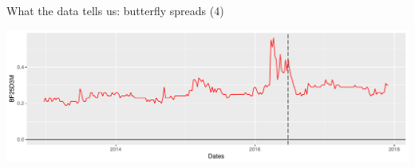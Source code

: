 \begin{frame}[fragile]{What the data tells us: butterfly spreads (4)}

\begin{Shaded}
\begin{Highlighting}[]
\StringTok{ }\OperatorTok{+}\StringTok{ }\NormalTok{(}\NormalTok{) }\OperatorTok{+}\StringTok{ }
\StringTok{        }\NormalTok{(}\NormalTok{)}
\StringTok{ }\OperatorTok{+}\StringTok{ }\NormalTok{(}\NormalTok{(}\NormalTok{((}\NormalTok{))),}
                     \NormalTok{)}
\end{Highlighting}
\end{Shaded}

\begin{center}\includegraphics[width=1\linewidth]{2018_02_07_IMF_FXCourse_files/figure-beamer/unnamed-chunk-18-1} \end{center}

\end{frame}

